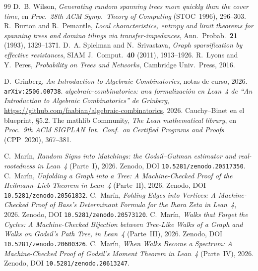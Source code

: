 \documentclass[11pt]{article}
\begin{document}
\begin{thebibliography}{99}
 D.~B. Wilson, \emph{Generating random spanning trees more quickly than the
cover time}, en \emph{Proc.\ 28th ACM Symp.\ Theory of Computing} (STOC~1996), 296--303.
 R.~Burton and R.~Pemantle, \emph{Local characteristics, entropy
and limit theorems for spanning trees and domino tilings via transfer-impedances}, Ann.\
Probab.\ \textbf{21} (1993), 1329--1371.
 D.~A. Spielman and N.~Srivastava, \emph{Graph sparsification
by effective resistances}, SIAM J.~Comput.\ \textbf{40} (2011), 1913--1926.
\bibitem{LyonsPeres} R.~Lyons and Y.~Peres, \emph{Probability on Trees and Networks}, Cambridge
Univ.\ Press, 2016.

 D.~Grinberg, \emph{An Introduction to Algebraic Combinatorics}, notas de
curso, 2026. \texttt{arXiv:2506.00738}.
 \emph{algebraic-combinatorics: una formalizaci\'on en Lean~4 de ``An
Introduction to Algebraic Combinatorics'' de Grinberg},
\url{https://github.com/faabian/algebraic-combinatorics}, 2026. Cauchy--Binet en el blueprint,
\S5.2.
 The mathlib Community, \emph{The Lean mathematical library}, en \emph{Proc.\
9th ACM SIGPLAN Int.\ Conf.\ on Certified Programs and Proofs} (CPP~2020), 367--381.

 C.~Mar\'in, \emph{Random Signs into Matchings: the Godsil--Gutman estimator and
real-rootedness in Lean~4} (Parte~I), 2026. Zenodo, DOI \texttt{10.5281/zenodo.20517350}.
\bibitem{PartII} C.~Mar\'in, \emph{Unfolding a Graph into a Tree: A Machine-Checked Proof of
the Heilmann--Lieb Theorem in Lean~4} (Parte~II), 2026. Zenodo, DOI
\texttt{10.5281/zenodo.20561832}.
\bibitem{Bass} C.~Mar\'in, \emph{Folding Edges into Vertices: A Machine-Checked Proof of Bass's
Determinant Formula for the Ihara Zeta in Lean~4}, 2026. Zenodo, DOI
\texttt{10.5281/zenodo.20573120}.
\bibitem{PartIII} C.~Mar\'in, \emph{Walks that Forget the Cycles: A Machine-Checked Bijection
between Tree-Like Walks of a Graph and Walks on Godsil's Path Tree, in Lean~4} (Parte~III),
2026. Zenodo, DOI \texttt{10.5281/zenodo.20600326}.
\bibitem{PartIV} C.~Mar\'in, \emph{When Walks Become a Spectrum: A Machine-Checked Proof of
Godsil's Moment Theorem in Lean~4} (Parte~IV), 2026. Zenodo, DOI
\texttt{10.5281/zenodo.20613247}.

\end{thebibliography}
\end{document}
